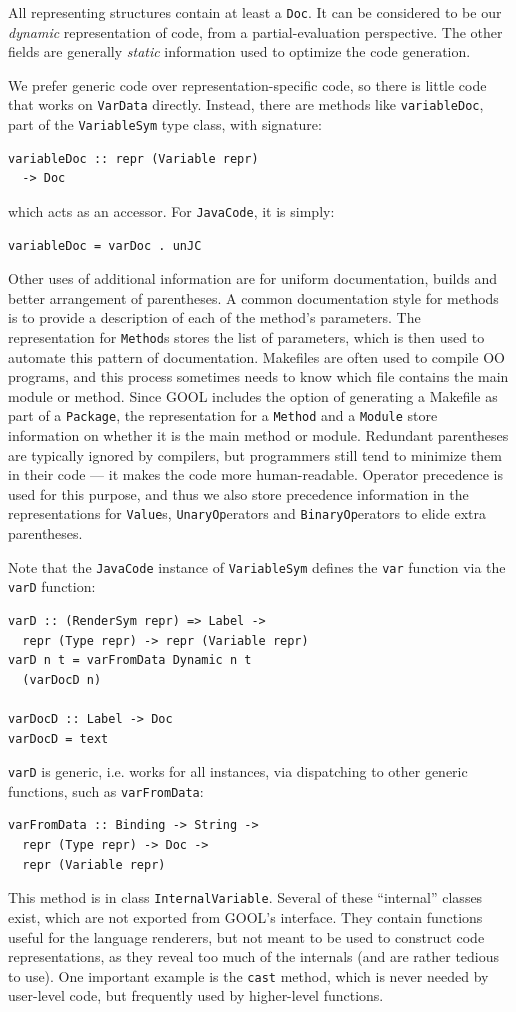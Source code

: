 \documentclass[sigplan,review,anonymous,prologue,dvipsnames]{acmart}
\begin{document}
All representing structures contain at least a \verb|Doc|. It can be considered
to be our \emph{dynamic} representation of code, from a partial-evaluation
perspective. The other fields are generally \emph{static} information used to
optimize the code generation.

We prefer generic code over representation-specific code, so there is little
code that works on \verb|VarData| directly.  Instead, there are
methods like \verb|variableDoc|, part of the \verb|VariableSym| type class,
with signature:
\begin{lstlisting}
variableDoc :: repr (Variable repr)
  -> Doc
\end{lstlisting}
which acts as an accessor.  For \verb|JavaCode|, it is simply:
\begin{lstlisting}
variableDoc = varDoc . unJC
\end{lstlisting}

Other uses of additional information are for uniform documentation,
builds and better arrangement of parentheses.
A common documentation style for methods is to provide a 
description of each of the method's parameters. The representation for 
\verb|Method|s stores the list of parameters, which is then used to
automate this pattern of documentation. Makefiles are often used to
compile OO programs, and this process sometimes needs to know which file
contains the main module or method.  Since GOOL includes the option of 
generating a Makefile as part of a \verb|Package|, the representation for 
a \verb|Method| and a \verb|Module| store information on whether it is 
the main method or module. Redundant parentheses are typically ignored by 
compilers, but programmers still tend to minimize them in their code ---
it makes the code more human-readable. Operator precedence is used for
this purpose, and thus we also 
store precedence information in the representations for \verb|Value|s, 
\verb|UnaryOp|erators and \verb|BinaryOp|erators to elide extra
parentheses.

Note that the \verb|JavaCode| instance of \verb|VariableSym| defines the
\verb|var| function via the \verb|varD| function:
\begin{lstlisting}
varD :: (RenderSym repr) => Label ->
  repr (Type repr) -> repr (Variable repr)
varD n t = varFromData Dynamic n t
  (varDocD n)

varDocD :: Label -> Doc
varDocD = text
\end{lstlisting}
\verb|varD| is generic, i.e. works for all instances, via dispatching to other
generic functions, such as \verb|varFromData|:
\begin{lstlisting}
varFromData :: Binding -> String ->
  repr (Type repr) -> Doc ->
  repr (Variable repr)
\end{lstlisting}
This method is in class \verb|InternalVariable|. Several of these
``internal'' classes exist, which are not exported from GOOL's interface.
They contain functions useful for the language renderers, but
not meant to be used to construct code representations, as they reveal too
much of the internals (and are rather tedious to use).  One important
example is the \verb|cast| method, which is never needed by user-level code,
but frequently used by higher-level functions.
\end{document}
